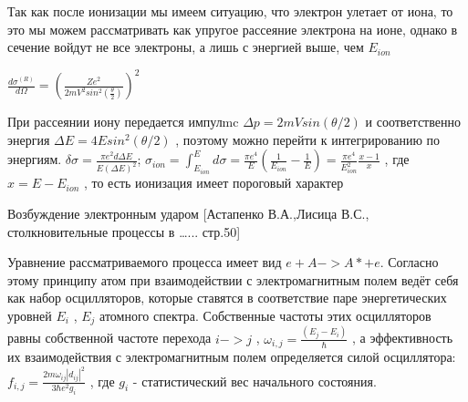 \documentclass[10pt, a4paper]{article}
\begin{document}
Так как после ионизации мы имеем ситуацию, что электрон улетает от иона, то это мы можем рассматривать как упругое рассеяние электрона на ионе, однако в сечение войдут не все электроны, а лишь с энергией выше, чем $E_{ion}$

$\frac{d\sigma^{(R)}}{d\Omega}=(\frac{Ze^{2}}{2mV^{2}sin^{2}(\frac{\theta}{2})})^{2}$

При рассеянии иону передается импулmc $\Delta p=2mVsin(\theta/2)$ и соответственно энергия $\Delta E=4 E sin^{2}(\theta/2)$ , поэтому можно перейти к интегрированию по энергиям.
$\delta \sigma =\frac {\pi e^{2}d\Delta E}{E(\Delta E)^2}$; 
$\sigma_{ion}=\int_{E_{ion}}^{E} d\sigma=\frac{\pi e^4}{E}(\frac{1}{E_{ion}}-\frac{1}{E})=\frac{\pi e^4}{E_{ion}^{2}}\frac{x-1}{x}$
, где $x=E-E_{ion}$ , то есть ионизация имеет пороговый характер


Возбуждение электронным ударом [Астапенко В.А.,Лисица В.С., столкновительные процессы в …... стр.50]


Уравнение рассматриваемого процесса имеет вид $e + A -> A* + e$. Согласно этому принципу атом при взаимодействии с электромагнитным полем ведёт себя как набор осцилляторов, которые ставятся в соответствие паре энергетических уровней $E_i$ , $E_j$ атомного спектра. Собственные частоты этих осцилляторов равны собственной частоте перехода $i -> j$ , $\omega _{i,j}=\frac{(E_j-E_i)}{\hbar}$ , а эффективность их взаимодействия с электромагнитным полем определяется силой осциллятора:
$f_{i,j}=\frac{2m\omega_{ij} {|d_{ij}|}^{2} }{3\hbar e^{2} g_i}$
, где $g_i$ - статистический вес начального состояния. 
\end{document}
